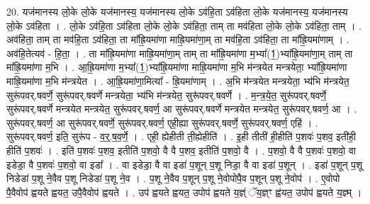 \documentclass[17pt]{extarticle}
\begin{document}
20. यज॑मानस्य लो॒के लो॒के यज॑मानस्य॒ यज॑मानस्य लो॒के ऽव॑हि॒ता ऽव॑हिता लो॒के यज॑मानस्य॒ यज॑मानस्य 
लो॒के ऽव॑हिता । . लो॒के ऽव॑हि॒ता ऽव॑हिता लो॒के लो॒के ऽव॑हिता॒ ताम् ता मव॑हिता लो॒के लो॒के ऽव॑हिता॒ ताम् । . अव॑हिता॒ ताम् ता मव॑हि॒ता ऽव॑हिता॒ ता मा᳚ह्रि॒यमा॑णा माह्रि॒यमा॑णा॒म् ता मव॑हि॒ता ऽव॑हिता॒ ता मा᳚ह्रि॒यमा॑णाम् । . अव॑हि॒तेत्यव॑ - हि॒ता॒ । . ता मा᳚ह्रि॒यमा॑णा माह्रि॒यमा॑णा॒म् ताम् ता मा᳚ह्रि॒यमा॑णा म॒भ्या᳚(1॒)भ्या᳚ह्रि॒यमा॑णा॒म् ताम् ता मा᳚ह्रि॒यमा॑णा म॒भि । . आ॒ह्रि॒यमा॑णा म॒भ्या᳚(1॒)भ्या᳚ह्रि॒यमा॑णा माह्रि॒यमा॑णा म॒भि म॑न्त्रयेत मन्त्रयेता॒ भ्या᳚ह्रि॒यमा॑णा माह्रि॒यमा॑णा म॒भि म॑न्त्रयेत । . आ॒ह्रि॒यमा॑णा॒मित्या᳚ - ह्रि॒यमा॑णाम् । . अ॒भि म॑न्त्रयेत मन्त्रयेता॒ भ्य॑भि म॑न्त्रयेत॒ सुरू॑पवर्.षवर्णे॒ सुरू॑पवर्.षवर्णे मन्त्रयेता॒ भ्य॑भि म॑न्त्रयेत॒ सुरू॑पवर्.षवर्णे । . म॒न्त्र॒ये॒त॒ सुरू॑पवर्.षवर्णे॒ सुरू॑पवर्.षवर्णे मन्त्रयेत मन्त्रयेत॒ सुरू॑पवर्.षवर्ण॒ आ सुरू॑पवर्.षवर्णे मन्त्रयेत मन्त्रयेत॒ सुरू॑पवर्.षवर्ण॒ आ । . सुरू॑पवर्.षवर्ण॒ आ सुरू॑पवर्.षवर्णे॒ सुरू॑पवर्.षवर्ण॒ एही॒ह्या सुरू॑पवर्.षवर्णे॒ सुरू॑पवर्.षवर्ण॒ एहि॑ । . सुरू॑पवर्.षवर्ण॒ इति॒ सुरू॑प - व॒र्॒.ष॒व॒र्णे॒ । . एही॒ ह्येहीती ती॒ह्येहीति॑ । . इ॒ही तीती॑ ही॒हीति॑ प॒शवः॑ प॒शव॒ इती॑ही॒ हीति॑ प॒शवः॑ । . इति॑ प॒शवः॑ प॒शव॒ इतीति॑ प॒शवो॒ वै वै प॒शव॒ इतीति॑ प॒शवो॒ वै । . प॒शवो॒ वै वै प॒शवः॑ प॒शवो॒ वा इडेडा॒ वै प॒शवः॑ प॒शवो॒ वा इडा᳚ । . वा इडेडा॒ वै वा इडा॑ प॒शून् प॒शू निडा॒ वै वा इडा॑ प॒शून् । . इडा॑ प॒शून् प॒शू निडेडा॑ प॒शू ने॒वैव प॒शू निडेडा॑ प॒शू ने॒व । . प॒शू ने॒वैव प॒शून् प॒शू ने॒वोपोपै॒व प॒शून् प॒शू ने॒वोप॑ । . ए॒वोपो पै॒वैवोप॑ ह्वयते ह्वयत॒ उपै॒वैवोप॑ ह्वयते । . उप॑ ह्वयते ह्वयत॒ उपोप॑ ह्वयते य॒ज्ञ्ं ॅय॒ज्ञ्ꣳ ह्व॑यत॒ उपोप॑ ह्वयते य॒ज्ञ्म् । \newline
\end{document}
